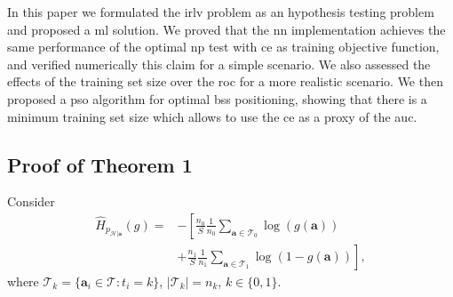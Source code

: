 \documentclass[conference,final]{IEEEtran}
\newcommand{\hatcross}[2]{\hat{H}_{#1}(#2)}
\newcommand{\gy}{g(\bm a)}
\begin{document}
In this paper we formulated the \ac{irlv} problem as an hypothesis testing problem and proposed a \ac{ml} solution. We proved that the \ac{nn} implementation achieves the same performance of the optimal \ac{np} test with \ac{ce} as training objective function, and verified numerically this claim for a simple scenario. We also assessed the effects of the training set size over the \ac{roc} for a more realistic scenario. We then proposed a \ac{pso} algorithm for   optimal \acp{bs} positioning, showing that there is a minimum training set size which allows to use the \ac{ce} as a proxy of the \ac{auc}.

\begin{appendices}
\section{Proof of Theorem 1}
Consider
\begin{equation}
\begin{split}
	\hatcross{ p_{\mathcal{H}|\bm a}}{g} =&  - \left[ \frac{n_0}{S} \frac{1}{n_0} \sum_{\bm a \in \mathcal{T}_0} \log(\gy) \right. \\
		&\left. + \frac{n_1}{S} \frac{1}{n_1} \sum_{\bm a \in \mathcal{T}_1} \log(1-\gy) \right],	
\end{split}
\end{equation}
where $\mathcal{T}_k = \{\bm a_i \in \mathcal{T} : t_i = k\}$, $|\mathcal{T}_k|=n_k$, $k \in \{0,1\}$.

\balance


\end{appendices}
\end{document}
